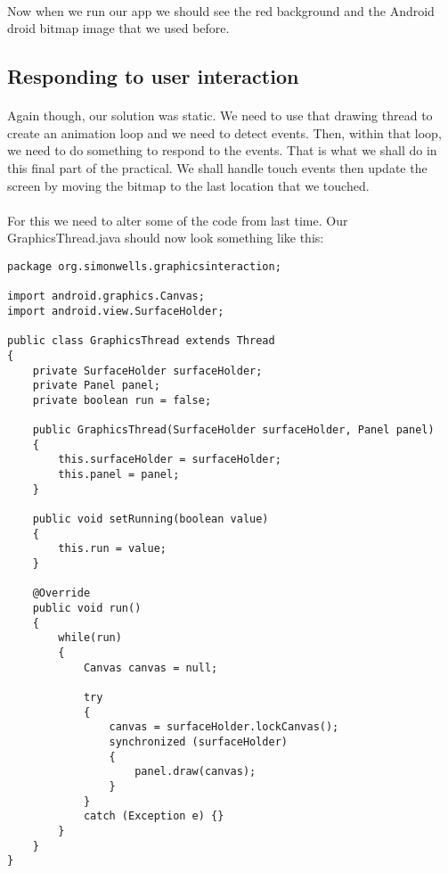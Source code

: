 \paragraph{} Now when we run our app we should see the red background and the Android droid bitmap image that we used before.


\subsection{Responding to user interaction}
\paragraph{} Again though, our solution was static. We need to use that drawing thread to create an animation loop and we need to detect events. Then, within that loop, we need to do something to respond to the events. That is what we shall do in this final part of the practical. We shall handle touch events then update the screen by moving the bitmap to the last location that we touched.

\paragraph{} For this we need to alter some of the code from last time. Our GraphicsThread.java should now look something like this:

\begin{lstlisting}
package org.simonwells.graphicsinteraction;

import android.graphics.Canvas;
import android.view.SurfaceHolder;

public class GraphicsThread extends Thread
{
    private SurfaceHolder surfaceHolder;
    private Panel panel;
    private boolean run = false;

    public GraphicsThread(SurfaceHolder surfaceHolder, Panel panel)
    {
        this.surfaceHolder = surfaceHolder;
        this.panel = panel;
    }

    public void setRunning(boolean value)
    {
        this.run = value;
    }

    @Override
    public void run()
    {
        while(run)
        {
            Canvas canvas = null;

            try
            {
                canvas = surfaceHolder.lockCanvas();
                synchronized (surfaceHolder)
                {
                    panel.draw(canvas);
                }
            }
            catch (Exception e) {}
        }
    }
}
\end{lstlisting}

